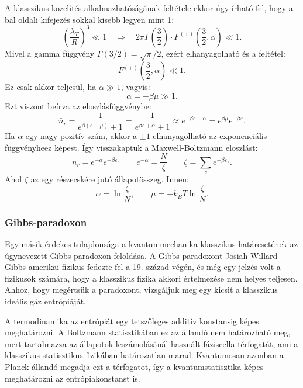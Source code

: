 \documentclass[../main.tex]{subfiles}
\begin{document}
A klasszikus közelítés alkalmazhatóságának feltétele ekkor úgy írható fel, hogy a bal oldali kifejezés sokkal kisebb legyen mint 1:
\begin{equation}
    \left( \frac{\lambda_T}{R} \right)^3 \ll 1 \quad \Rightarrow \quad 2 \pi \Gamma(\frac{3}{2}) \cdot F^{(\pm)}(\frac{3}{2}, \alpha) \ll 1.
\end{equation}
Mivel a gamma függvény $\Gamma(3/2) = \sqrt{\pi}/2$, ezért elhanyagolható és a feltétel:
\begin{equation}
    F^{(\pm)}(\frac{3}{2}, \alpha) \ll 1.
\end{equation}
Ez csak akkor teljesül, ha $\alpha \gg 1$, vagyis:
\begin{equation}
    \alpha = -\beta \mu \gg 1.
\end{equation}
Ezt viszont beírva az eloszlásfüggvénybe:
\begin{equation}
    \bar{n}_r = \frac{1}{e^{\beta (\varepsilon - \mu)} \pm 1} = \frac{1}{e^{\beta \varepsilon + \alpha} \pm 1} \approx e^{-\beta \varepsilon - \alpha} = e^{\beta \mu} e^{-\beta \varepsilon}.
\end{equation}
Ha $\alpha$ egy nagy pozitív szám, akkor a $\pm 1$ elhanyagolható az exponenciális függvényheez képest. Így visszakaptuk a Maxwell-Boltzmann eloszlást:
\begin{equation}
    \bar{n}_r = e^{-\alpha} e^{-\beta \varepsilon_r} \qquad e^{-\alpha} = \frac{N}{\zeta} \qquad \zeta = \sum_s e^{-\beta \varepsilon_s}.
\end{equation}
Ahol $\zeta$ az egy részecskére jutó állapotösszeg. Innen:
\begin{equation}
    \alpha = \ln \frac{\zeta}{N}, \qquad \mu = -k_B T \ln \frac{\zeta}{N}.
\end{equation}

\subsubsection{Gibbs-paradoxon}
Egy másik érdekes tulajdonsága a kvantummechanika klasszikus határesetének az úgynevezett Gibbs-paradoxon feloldása. A Gibbs-paradoxont Josiah Willard Gibbs amerikai fizikus fedezte fel a 19. század végén,
és még egy jelzés volt a fizikusok számára, hogy a klasszikus fizika akkori értelmezése nem helyes teljesen. Ahhoz, hogy megértsük a paradoxont, vizsgáljuk meg egy kicsit a klasszikus ideális gáz entrópiáját.

A termodinamika az entrópiát egy tetszőleges additív konstansig képes meghatározni. A Boltzmann statisztikában ez az állandó nem határozható meg, mert tartalmazza az állapotok leszámolásánál használt
fáziscella térfogatát, ami a klasszikus statisztikus fizikában határozatlan marad. Kvantumosan azonban a Planck-állandó megadja ezt a térfogatot, így a kvantumstatisztika képes meghatározni az entrópiakonstanst is.
\end{document}
